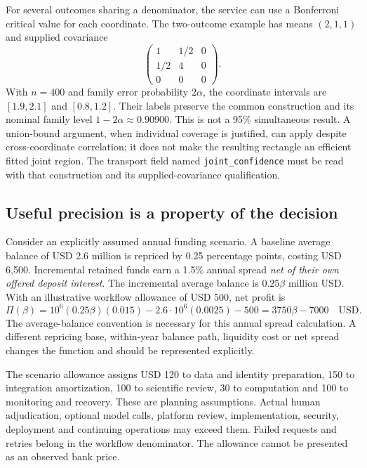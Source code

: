 For several outcomes sharing a denominator, the service can use a
Bonferroni critical value for each coordinate. The two-outcome example has
means $(2,1,1)$ and supplied covariance
\[
 \begin{pmatrix}1&1/2&0\\1/2&4&0\\0&0&0\end{pmatrix}.
\]
With $n=400$ and family error probability $2\alpha$, the coordinate intervals
are $[1.9,2.1]$ and $[0.8,1.2]$. Their labels preserve the common construction
and its nominal family level $1-2\alpha\approx0.90900$. This is not a
95\% simultaneous result. A union-bound argument, when individual coverage
is justified, can apply despite cross-coordinate correlation; it does not
make the resulting rectangle an efficient fitted joint region. The transport
field named \texttt{joint\_confidence} must be read with that construction
and its supplied-covariance qualification.

\subsection{Useful precision is a property of the decision}

Consider an explicitly assumed annual funding scenario. A baseline average
balance of USD 2.6 million is repriced by 0.25 percentage points, costing
USD 6,500. Incremental retained funds earn a 1.5\% annual spread
\emph{net of their own offered deposit interest}. The incremental average
balance is $0.25\beta$ million USD. With an illustrative workflow allowance
of USD 500, net profit is
\begin{equation}
 \Pi(\beta)
 =10^6(0.25\beta)(0.015)
   -2.6\mathbin{\cdot}10^6(0.0025)-500
 =3750\beta-7000\quad\text{USD}.
 \label{exec13:funding-profit}
\end{equation}
The average-balance convention is necessary for this annual spread
calculation. A different repricing base, within-year balance path, liquidity
cost or net spread changes the function and should be represented explicitly.

The scenario allowance assigns USD 120 to data and identity preparation,
150 to integration amortization, 100 to scientific review, 30 to computation
and 100 to monitoring and recovery. These are planning assumptions. Actual
human adjudication, optional model calls, platform review, implementation,
security, deployment and continuing operations may exceed them. Failed
requests and retries belong in the workflow denominator. The allowance
cannot be presented as an observed bank price.

